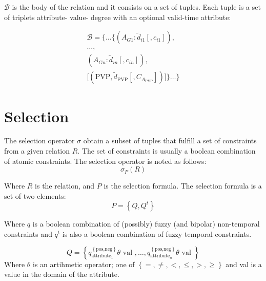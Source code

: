 \documentclass{llncs}
\newcommand{\Body}{\mathcal{B}}
\begin{document}
\begin{definition}
$\Body$ is the body of the relation and it consists on a set of tuples. Each tuple is a set of triplets attribute- value- degree with an optional valid-time attribute:

\begin{align}
\label{eq:body-valid-time}
\Body = \big \lbrace \ldots \{ \left(A_{G1}:\tilde{d}_{i1}\left[,c_{i1} \right] \right),\\
\nonumber
 \ldots,\\
 \nonumber
  \left(A_{Gn}:\tilde{d}_{in}\left[,c_{in} \right] \right),\\
  \nonumber
   \Big[  \left( \text{PVP}, \tilde{d}_{\text{PVP}} \left[,C_{A_{\text{PVP}}} \right] \right)  \Big] \} \ldots \big \rbrace
\end{align}

\end{definition}







\section{\label{sec:selection}Selection}
The selection operator $\sigma$ obtain a subset of tuples that fulfill a set of constraints from a given relation $R$. The set of constraints is usually a boolean combination of atomic constraints. The selection operator is noted as follows:
\begin{equation}
 \label{eq:selection}
\sigma_{P} \left( R \right)
\end{equation}

Where $R$ is the relation, and $P$ is the selection formula. The selection formula is a set of two elements:
\begin{equation}
 \label{eq:selection_formula}
P = \left \lbrace Q, Q^{t}\right \rbrace
\end{equation}

Where $q$ is a boolean combination of (possibly) fuzzy (and bipolar) non-temporal constraints and $q^{t}$ is also a boolean combination of fuzzy temporal constraints.

\begin{equation}
 \label{eq:non-temporal-constraints}
Q = \left \lbrace q^{\left \lbrace \mbox{pos,neg} \right \rbrace}_{\mbox{attribute}_1}  \theta \mbox{ val }, \ldots, q^{\left \lbrace \mbox{pos,neg} \right \rbrace}_{\mbox{attribute}_n}  \theta \mbox{ val } \right \rbrace
\end{equation}
Where $\theta$ is an artihmetic operator; one of $\left \lbrace =, \neq, <, \leq, >, \geq \right \rbrace$ and val is a value in the domain of the attribute. 
\end{document}
